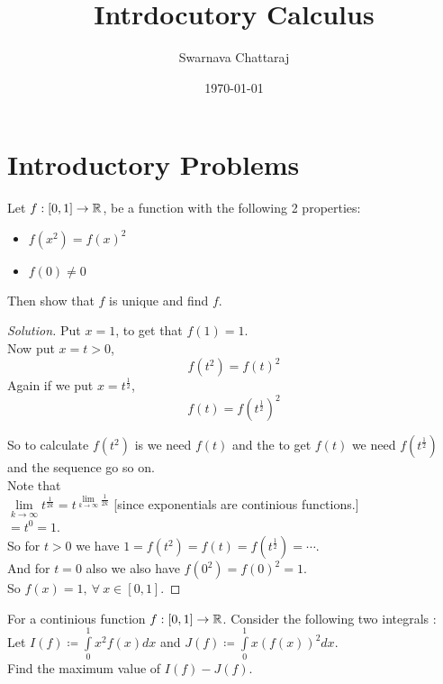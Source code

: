 \documentclass{scrartcl} %
\title{Intrdocutory Calculus}
\author{Swarnava Chattaraj}
\date{\today}
\begin{document}
\maketitle

\section{Introductory Problems} 
\begin{example}
	Let $f: [0,1] \rightarrow \mathbb R$, be a function with the following
	2 properties:
	\begin{itemize}
		\item $f(x^2) = f(x)^2$
		\item $f(0) \neq 0$
	\end{itemize}
	Then show that $f$ is unique and find $f$.
\end{example}
\begin{proof}[Solution]
Put $x = 1$, to get that $f(1) = 1$.\\
Now put $x = t > 0$, 
\[
	f(t^2) = f(t)^2
\]
Again if we put $x = t^{\frac{1}{2}}$,
\[
	f(t)  = f(t^{\frac{1}{2}})^2
\]

So to calculate $f(t^2)$ is we need $f(t)$ and the to get $f(t)$ we need $f(t^{\frac{1}{2}})$ and the sequence go so on.\\
Note that\\ $\lim\limits_{k \rightarrow \infty} t^{\frac{1}{2k}} = t^{\lim\limits_{k \rightarrow \infty} \frac{1}{2k}} $ [since exponentials are continious functions.]\\
$= t^0 = 1$.
\\
So for $t > 0$ we have $1 = f(t^2) = f(t) = f(t^{\frac{1}{2}}) = \cdots$.\\
And for $t = 0$ also we also have $f(0^2) = f(0)^2 = 1$.\\
So $\boxed{f(x) = 1, \ \forall\ x \in [0,1]}$.
\end{proof}
\newpage
\begin{example}[Putnam B5, 2006]
	For a continious function $f: [0,1] \rightarrow \mathbb R$. Consider the following two integrals : \\
	Let $I(f) \coloneq \int\limits_0^1 x^2f(x)dx$
	and $J(f) \coloneq \int\limits_0^1 x(f(x))^2dx$.
\\	Find the maximum value of $I(f) - J(f)$.

\end{example}
\end{document}
